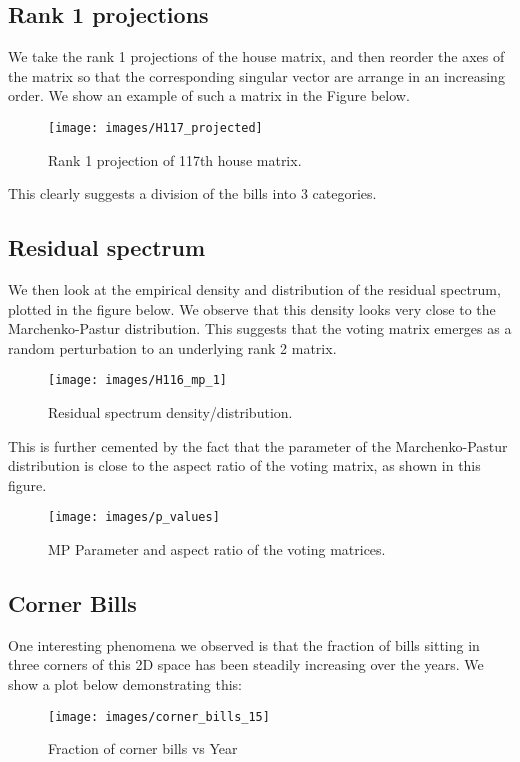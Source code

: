 \documentclass[11pt, letter]{article}
\begin{document}
\subsection{Rank 1 projections}
        We take the rank 1 projections of the house matrix, and then reorder the axes of the matrix so that the corresponding
        singular vector are arrange in an increasing order. We show an example of such a matrix in the Figure below.
        \begin{figure}[t]
        \texttt{[image: images/H117\_projected]}
        \centering
        \caption{Rank 1 projection of 117th house matrix.}
        \end{figure}
        This clearly suggests a division of the bills into 3 categories. 

\subsection{Residual spectrum}
        We then look at the empirical density and distribution of the residual spectrum, plotted in the figure below.
        We observe that this density looks very close to the Marchenko-Pastur distribution. This
        suggests that the voting matrix emerges as a random perturbation to an underlying
        rank 2 matrix. 
        \begin{figure}[t]
        \texttt{[image: images/H116\_mp\_1]}
        \centering
        \caption{Residual spectrum density/distribution.}
        \end{figure}
        This is further cemented by the fact that the parameter of the Marchenko-Pastur
        distribution is close to the aspect ratio of the voting matrix, as shown in this figure.
        \begin{figure}[t]
        \texttt{[image: images/p\_values]}
        \centering
        \caption{MP Parameter and aspect ratio of the voting matrices.}
        \end{figure}

\subsection{Corner Bills}
        One interesting phenomena we observed is that the fraction of bills sitting in three corners
        of this 2D space has been steadily increasing over the years. We show a plot below
        demonstrating this:
        \begin{figure}[t]
        \texttt{[image: images/corner\_bills\_15]}
        \centering
        \caption{Fraction of corner bills vs Year}
        \end{figure}
\end{document}
